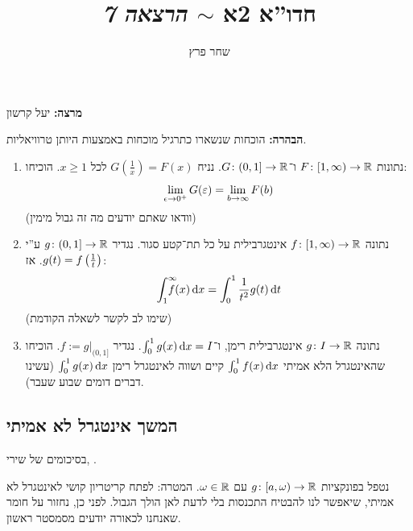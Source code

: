 \documentclass[]{../../../../tex/classes/styledArticle}
\author{שחר פרץ}
\title{חדו''א 2א $\sim$ \textit{הרצאה 7}}
\begin{document}
	\maketitle
	\textbf{מרצה: }יעל קרשון
	
	\textbf{הבהרה: }הוכחות שנשארו כתרגיל מוכחות באמצעות היותן טרוויאליות. 
	
	\begin{Exercise}[פתיחה]
		\begin{enumerate}
			\item נתונות $F \colon [1, \infty) \to \mathbb{R}$ ו־$G \colon (0, 1] \to \mathbb{R}$. נניח $G(\frac{1}{x}) = F(x)$ לכל $x \ge 1$. הוכיחו: 
			\[ \lim_{\epsi \to 0^{+}}G(\eg) = \lim_{b \to \infty}F(b) \]
			(וודאו שאתם יודעים מה זה גבול מימין)
			\item נתונה $f \colon [1, \infty) \to \mathbb{R}$ אינטגרבילית על כל תת־קטע סגור. נגדיר $g \colon (0, 1] \to \mathbb{R}$ ע''י $g(t) = f\left ( \frac{1}{t} \right )$. אז: 
			\[ \int^{\infty}_1\!\!\!\!\!\! f(x)\,\mathrm{d}x = \int^{1}_0 \frac{1}{t^{2}}g(t) \,\mathrm{d}t \]
			(שימו לב לקשר לשאלה הקודמת)
			\item נתונה $g \colon I \to \mathbb{R}$ אינטגרבילית רימן, ו־$\int^{1}_0 g(x) \,\mathrm{d}x = I$. נגדיר $f:= g|_{(0, 1]}$. הוכיחו שהאינטגרל הלא אמיתי $\int^{1}_0f(x)\,\mathrm{d}x$ קיים ושווה לאינטגרל רימן $\int^{1}_0 g(x)\,\mathrm{d}x$ (עשינו דברים דומים שבוע שעבר). 
		\end{enumerate}
	\end{Exercise}
	
	\subsection*{המשך אינטגרל לא אמיתי}
	בסיכומים של שירי, . 
	
	נטפל בפונקציות $g \colon [a, \omega) \to \mathbb{R}$ עם $\omega \in \mathbb{R}$. 
	\exe{רשמו הגדרות/טענות/הוכחות המתאימות ל־: 
	\begin{itemize}
		\item $g \co [1, \infty) \to \R$ (התנהגות כאשר $x \to \infty$)
		\item $g \co (0, 1) \to \R$ (התנהגות כאשר $x \to 0^{+}$)
	\end{itemize}}
	המטרה: לפתח קריטריון קושי לאינטגרל לא אמיתי, שיאפשר לנו להבטיח התכנסות בלי לדעת לאן הולך הגבול. לפני כן, נחזור על חומר שאנחנו לכאורה יודעים מסמסטר ראשון. 
\end{document}
